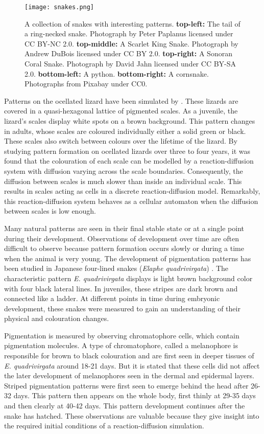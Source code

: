 \begin{figure}[hb]
	\centering
	\texttt{[image: snakes.png]}
	\caption{A collection of snakes with interesting patterns. \textbf{top-left:} The tail of a ring-necked snake. Photograph by Peter Paplanus licensed under CC BY-NC 2.0. \textbf{top-middle:} A Scarlet King Snake. Photograph by Andrew DuBois licensed under CC BY 2.0. \textbf{top-right:} A Sonoran Coral Snake. Photograph by David Jahn licensed under CC BY-SA 2.0. \textbf{bottom-left:} A python. \textbf{bottom-right:} A cornsnake. Photographs from Pixabay under CC0.}
	\label{fig:realSnakePatterns}
\end{figure}

Patterns on the ocellated lizard have been simulated by \citep{manukyan2017}. These lizards are covered in a quasi-hexagonal lattice of pigmented scales. As a juvenile, the lizard's scales display white spots on a brown background. This pattern changes in adults, whose scales are coloured individually either a solid green or black. These scales also switch between colours over the lifetime of the lizard. By studying pattern formation on ocellated lizards over three to four years, it was found that the colouration of each scale can be modelled by a reaction-diffusion system with diffusion varying across the scale boundaries. Consequently, the diffusion between scales is much slower than inside an individual scale. This results in scales acting as cells in a discrete reaction-diffusion model. Remarkably, this reaction-diffusion system behaves as a cellular automaton when the diffusion between scales is low enough.

Many natural patterns are seen in their final stable state or at a single point during their development. Observations of development over time are often difficult to observe because pattern formation occurs slowly or during a time when the animal is very young. The development of pigmentation patterns has been studied in Japanese four-lined snakes (\textit{Elaphe quadrivirgata}) \citep{murakami2018}. The characteristic pattern \textit{E. quadrivirgata} displays is light brown background color with four black lateral lines. In juveniles, these stripes are dark brown and connected like a ladder. At different points in time during embryonic development, these snakes were measured to gain an understanding of their physical and colouration changes.
 
Pigmentation is measured by observing chromatophore cells, which contain pigmentation molecules. A type of chromatophore, called a melanophore is responsible for brown to black colouration and are first seen in deeper tissues of \textit{E. quadrivirgata} around 18-21 days. But it is stated that these cells did not affect the later development of melanophores seen in the dermal and epidermal layers. Striped pigmentation patterns were first seen to emerge behind the head after 26-32 days. This pattern then appears on the whole body, first thinly at 29-35 days and then clearly at 40-42 days. This pattern development continues after the snake has hatched. These observations are valuable because they give insight into the required initial conditions of a reaction-diffusion simulation.

